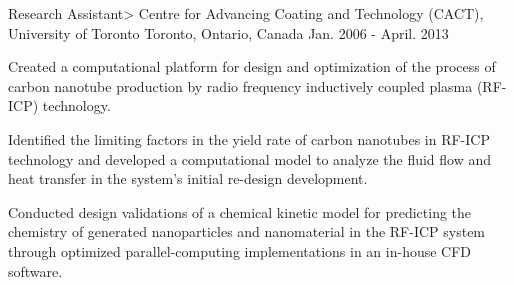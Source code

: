 \begin{cventries}

\cventry
{Research Assistant>} %
{Centre for Advancing Coating and Technology (CACT), University of Toronto} %
{Toronto, Ontario, Canada} %
{Jan. 2006 - April. 2013} %
{ %
\begin{cvitems}
\item {Created a computational platform for design and optimization of the process of carbon nanotube
production by radio frequency inductively coupled plasma (RF-ICP) technology.}
\item {Identified the limiting factors in the yield rate of carbon nanotubes in RF-ICP technology and
developed a computational model to analyze the fluid flow and heat transfer in the system's initial re-design development.}
\item{Conducted design validations of a chemical kinetic model for predicting the chemistry of generated nanoparticles and nanomaterial in the RF-ICP system through optimized parallel-computing
implementations in an in-house CFD software.}
\end{cvitems} 
}






\end{cventries}
